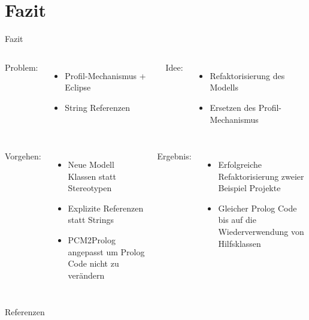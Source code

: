 \documentclass{sdqbeamer}
\begin{document}
\section{Fazit}
\begin{frame}{Fazit}
	\begin{columns}[t]
		Problem:
		\begin{itemize}
			\item Profil-Mechanismus + Eclipse
			\item String Referenzen
		\end{itemize}
		Idee:
			\begin{itemize}
			\item Refaktorisierung des Modells
			\item Ersetzen des Profil-Mechanismus
		\end{itemize}

	\end{columns}
	\vspace{0.05\textheight}
	\begin{columns}[t]
		Vorgehen:
		\begin{itemize}
		\item Neue Modell Klassen statt Stereotypen
		\item Explizite Referenzen statt Strings
		\item PCM2Prolog angepasst um Prolog Code nicht zu verändern
		\end{itemize}
	Ergebnis:
		\begin{itemize}
		\item Erfolgreiche Refaktorisierung zweier Beispiel Projekte
		\item Gleicher Prolog Code bis auf die Wiederverwendung von Hilfsklassen
\end{itemize}
\end{columns}
	
\end{frame}

\begin{frame}{Referenzen}
	\nocite{*}
	\printbibliography
\end{frame}
\appendix
\beginbackup

\backupend
\end{document}
